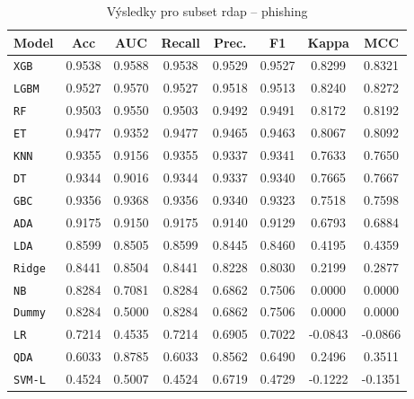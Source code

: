 \begin{table}[H]
  \centering
  \small
  \caption{Výsledky pro subset rdap – phishing}
  \begin{tabular}{|l|c|c|c|c|c|c|c|}
    \hline
    \textbf{Model} & \textbf{Acc} & \textbf{AUC} & \textbf{Recall} & \textbf{Prec.} & \textbf{F1} & \textbf{Kappa} & \textbf{MCC} \\
    \hline
    \texttt{XGB} & 0.9538 & 0.9588 & 0.9538 & 0.9529 & 0.9527 & 0.8299 & 0.8321 \\
    \texttt{LGBM} & 0.9527 & 0.9570 & 0.9527 & 0.9518 & 0.9513 & 0.8240 & 0.8272 \\
    \texttt{RF} & 0.9503 & 0.9550 & 0.9503 & 0.9492 & 0.9491 & 0.8172 & 0.8192 \\
    \texttt{ET} & 0.9477 & 0.9352 & 0.9477 & 0.9465 & 0.9463 & 0.8067 & 0.8092 \\
    \texttt{KNN} & 0.9355 & 0.9156 & 0.9355 & 0.9337 & 0.9341 & 0.7633 & 0.7650 \\
    \texttt{DT} & 0.9344 & 0.9016 & 0.9344 & 0.9337 & 0.9340 & 0.7665 & 0.7667 \\
    \texttt{GBC} & 0.9356 & 0.9368 & 0.9356 & 0.9340 & 0.9323 & 0.7518 & 0.7598 \\
    \texttt{ADA} & 0.9175 & 0.9150 & 0.9175 & 0.9140 & 0.9129 & 0.6793 & 0.6884 \\
    \texttt{LDA} & 0.8599 & 0.8505 & 0.8599 & 0.8445 & 0.8460 & 0.4195 & 0.4359 \\
    \texttt{Ridge} & 0.8441 & 0.8504 & 0.8441 & 0.8228 & 0.8030 & 0.2199 & 0.2877 \\
    \texttt{NB} & 0.8284 & 0.7081 & 0.8284 & 0.6862 & 0.7506 & 0.0000 & 0.0000 \\
    \texttt{Dummy} & 0.8284 & 0.5000 & 0.8284 & 0.6862 & 0.7506 & 0.0000 & 0.0000 \\
    \texttt{LR} & 0.7214 & 0.4535 & 0.7214 & 0.6905 & 0.7022 & -0.0843 & -0.0866 \\
    \texttt{QDA} & 0.6033 & 0.8785 & 0.6033 & 0.8562 & 0.6490 & 0.2496 & 0.3511 \\
    \texttt{SVM-L} & 0.4524 & 0.5007 & 0.4524 & 0.6719 & 0.4729 & -0.1222 & -0.1351 \\
    \hline
  \end{tabular}
\end{table}
\vspace{0.5cm}

